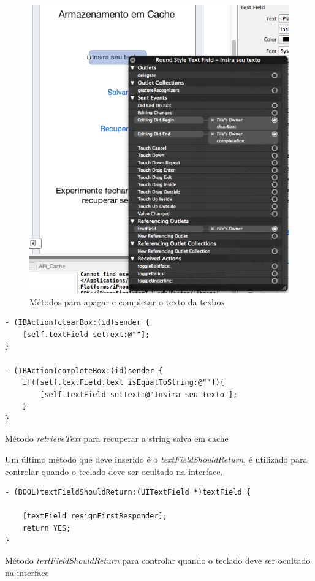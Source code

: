 \documentclass[a4paper,12pt,brazil,doubleside]{book}
\begin{document}
\begin{singlespace}
\begin{figure}[H]
  \centering
  \includegraphics[width=.75\textwidth]{figuras/4/app_cache_ibaction.png}
  \caption{Métodos para apagar e completar o texto da texbox}
  \label{fig:app_cache_ibaction}
\end{figure}

\begin{listing}[H]
\begin{verbatim}
- (IBAction)clearBox:(id)sender {
    [self.textField setText:@""];
}

- (IBAction)completeBox:(id)sender {
    if([self.textField.text isEqualToString:@""]){
        [self.textField setText:@"Insira seu texto"];
    }
}
\end{verbatim}
\caption{Método \emph{retrieveText} para recuperar a string salva em cache}
\end{listing}


Um último método que deve inserido é o \emph{textFieldShouldReturn}, é utilizado para controlar quando o teclado deve ser ocultado na interface.

\begin{listing}[H]
\begin{verbatim}
- (BOOL)textFieldShouldReturn:(UITextField *)textField {
    
    [textField resignFirstResponder];
    return YES;
}
\end{verbatim}
\caption{Método \emph{textFieldShouldReturn} para controlar quando o teclado deve ser ocultado na interface}
\end{listing}


\end{singlespace}
\end{document}
